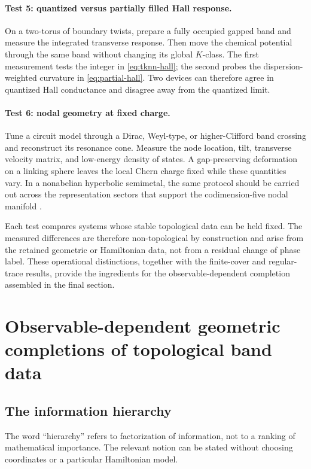 \documentclass[11pt]{article}
\theoremstyle{definition}
\theoremstyle{remark}
\begin{document}
\paragraph{Test 5: quantized versus partially filled Hall response.}
On a two-torus of boundary twists, prepare a fully occupied gapped band and
measure the integrated transverse response.  Then move the chemical potential
through the same band without changing its global \(K\)-class.  The first
measurement tests the integer in \eqref{eq:tknn-hall}; the second probes the
dispersion-weighted curvature in \eqref{eq:partial-hall}.  Two devices can
therefore agree in quantized Hall conductance and disagree away from the
quantized limit.

\paragraph{Test 6: nodal geometry at fixed charge.}
Tune a circuit model through a Dirac, Weyl-type, or higher-Clifford band
crossing and reconstruct its resonance cone.  Measure the node location,
tilt, transverse velocity matrix, and low-energy density of states.  A
gap-preserving deformation on a linking sphere leaves the local Chern charge
fixed while these quantities vary.  In a nonabelian hyperbolic semimetal, the
same protocol should be carried out across the representation sectors that
support the codimension-five nodal manifold
\cite{TummuruEtAl2024}.

Each test compares systems whose stable topological data can be held fixed.
The measured differences are therefore non-topological by construction and
arise from the retained geometric or Hamiltonian data, not from a residual
change of phase label.  These operational distinctions, together with the
finite-cover and regular-trace results, provide the ingredients for the
observable-dependent completion assembled in the final section.

\section{Observable-dependent geometric completions of topological band data}
\label{sec:completion}

\subsection{The information hierarchy}

The word ``hierarchy'' refers to factorization of information, not to a
ranking of mathematical importance.  The relevant notion can be stated
without choosing coordinates or a particular Hamiltonian model.
\end{document}
